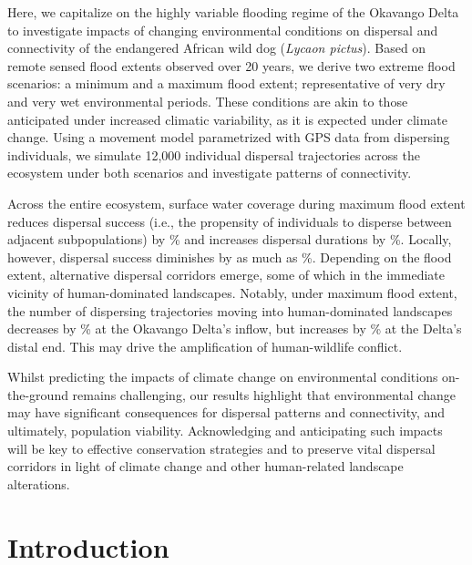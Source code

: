 \documentclass[../FinalThesis.tex]{subfiles}
\begin{document}
Here, we capitalize on the highly variable flooding regime of the Okavango Delta
to investigate impacts of changing environmental conditions on dispersal and
connectivity of the endangered African wild dog (\textit{Lycaon pictus}). Based
on remote sensed flood extents observed over 20 years, we derive two extreme
flood scenarios: a minimum and a maximum flood extent; representative of very
dry and very wet environmental periods. These conditions are akin to those
anticipated under increased climatic variability, as it is expected under
climate change. Using a movement model parametrized with GPS data from
dispersing individuals, we simulate 12,000 individual dispersal trajectories
across the ecosystem under both scenarios and investigate patterns of
connectivity.

Across the entire ecosystem, surface water coverage during maximum flood extent
reduces dispersal success (i.e., the propensity of individuals to disperse
between adjacent subpopulations) by
\% and
increases dispersal durations by
\%. Locally,
however, dispersal success diminishes by as much as
\%. Depending on the flood
extent, alternative dispersal corridors emerge, some of which in the immediate
vicinity of human-dominated landscapes. Notably, under maximum flood extent, the
number of dispersing trajectories moving into human-dominated landscapes
decreases by \% at the
Okavango Delta's inflow, but increases by
\% at the Delta's distal end. This
may drive the amplification of human-wildlife conflict.

Whilst predicting the impacts of climate change on environmental conditions
on-the-ground remains challenging, our results highlight that environmental
change may have significant consequences for dispersal patterns and
connectivity, and ultimately, population viability. Acknowledging and
anticipating such impacts will be key to effective conservation strategies and
to preserve vital dispersal corridors in light of climate change and other
human-related landscape alterations.

\newpage
\section{Introduction}
\end{document}
